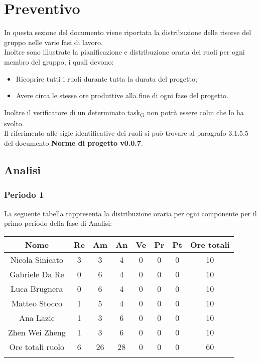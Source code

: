 \section{Preventivo}
In questa sezione del documento viene riportata la distribuzione delle risorse del gruppo nelle varie fasi di lavoro.\\
Inoltre sono illustrate la pianificazione e distribuzione oraria dei ruoli per ogni membro del gruppo, i quali devono:
\begin{itemize}
	\item Ricoprire tutti i ruoli durante tutta la durata del progetto;
	\item Avere circa le stesse ore produttive alla fine di ogni fase del progetto.
\end{itemize}
Inoltre il verificatore di un determinato task\textsubscript{G} non potrà essere colui che lo ha svolto.\\
Il riferimento alle sigle identificative dei ruoli si può trovare al paragrafo 3.1.5.5 del documento \textbf{Norme di progetto v0.0.7}.
\newpage
\subsection{Analisi}
%
\subsubsection{Periodo 1}
%
La seguente tabella rappresenta la distribuzione oraria per ogni componente per il primo periodo della fase di Analisi:

	\setlength\extrarowheight{5pt}
	\begin{tabularx}{\textwidth}{|ccccccc|c|}
		\hline
		\rowcolor{white}
		\textbf{Nome} & \textbf{Re} & \textbf{Am} & \textbf{An} & \textbf{Ve} & \textbf{Pr}& \textbf{Pt} & \textbf{Ore totali} \\
		\hline
		Nicola Sinicato &3&3&4&0&0&0&10 \\
		Gabriele Da Re &0&6&4&0&0&0&10 \\
		Luca Brugnera &0&6&4&0&0&0&10 \\
		Matteo Stocco &1&5&4&0&0&0&10 \\
		Ana Lazic &1&3&6&0&0&0&10 \\
		Zhen Wei Zheng &1&3&6&0&0&0&10 \\
		\hline
		Ore totali ruolo &6&26&28&0&0&0&60 \\
		\hline
		\rowcolor{white}
		\caption{ Distribuzione oraria durante il primo periodo di analisi per ruolo e persona}
	\end{tabularx}
	\vspace{10pt}
	


